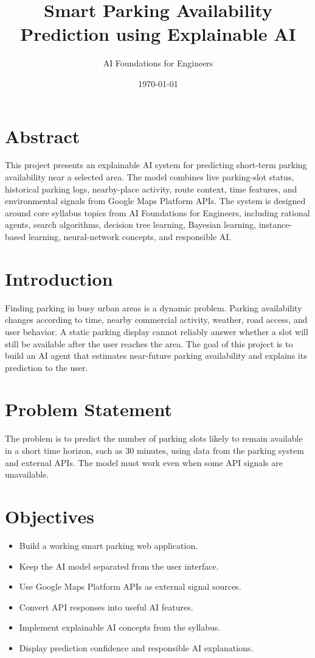 \documentclass[12pt,a4paper]{article}
\title{Smart Parking Availability Prediction using Explainable AI}
\author{AI Foundations for Engineers}
\date{\today}
\begin{document}
\maketitle
\tableofcontents
\newpage

\section{Abstract}
\label{sec:abstract}

This project presents an explainable AI system for predicting short-term parking availability near a selected area. The model combines live parking-slot status, historical parking logs, nearby-place activity, route context, time features, and environmental signals from Google Maps Platform APIs. The system is designed around core syllabus topics from AI Foundations for Engineers, including rational agents, search algorithms, decision tree learning, Bayesian learning, instance-based learning, neural-network concepts, and responsible AI.

\section{Introduction}
\label{sec:introduction}

Finding parking in busy urban areas is a dynamic problem. Parking availability changes according to time, nearby commercial activity, weather, road access, and user behavior. A static parking display cannot reliably answer whether a slot will still be available after the user reaches the area. The goal of this project is to build an AI agent that estimates near-future parking availability and explains its prediction to the user.

\section{Problem Statement}
\label{sec:problem-statement}

The problem is to predict the number of parking slots likely to remain available in a short time horizon, such as 30 minutes, using data from the parking system and external APIs. The model must work even when some API signals are unavailable.

\section{Objectives}
\label{sec:objectives}

\begin{itemize}
  \item Build a working smart parking web application.
  \item Keep the AI model separated from the user interface.
  \item Use Google Maps Platform APIs as external signal sources.
  \item Convert API responses into useful AI features.
  \item Implement explainable AI concepts from the syllabus.
  \item Display prediction confidence and responsible AI explanations.
\end{itemize}
\end{document}
